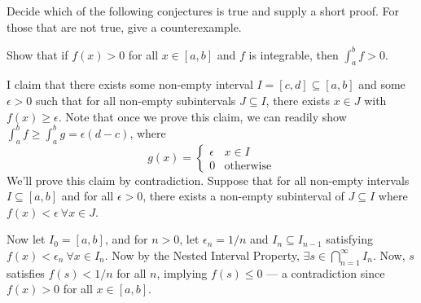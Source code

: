 \begin{exercise} Decide which of the following conjectures is true and supply a short proof. For those that are not true, give a counterexample.
\end{exercise}
\begin{solution}
\end{solution}

\begin{exercise} Show that if $f(x)>0$ for all $x \in[a, b]$ and $f$ is integrable, then $\int_{a}^{b} f>0$.
\end{exercise}
\begin{solution}
I claim that there exists some non-empty interval \(I = [c,d] \subseteq [a,b]\) and some \(\epsilon > 0\) such that for all non-empty subintervals \(J \subseteq I\), there exists \(x \in J\) with \(f(x) \geq \epsilon\). Note that once we prove this claim, we can readily show \(\int^b_a f \geq \int^b_a g = \epsilon (d-c)\), where
\[g(x) = \begin{cases}
    \epsilon & x \in I \\
    0 & \text{otherwise}
\end{cases}\]
We'll prove this claim by contradiction. Suppose that for all non-empty intervals \(I \subseteq [a,b]\) and for all \(\epsilon > 0\), there exists a non-empty subinterval of \(J \subseteq I\) where \(f(x) < \epsilon \ \forall x \in J \).

Now let \(I_0 = [a,b]\), and for \(n > 0\), let \(\epsilon_n = 1/n\) and \(I_n \subseteq I_{n-1}\) satisfying \(f(x) < \epsilon_n \ \forall x \in I_n\). Now by the Nested Interval Property, \(\exists s \in \bigcap^\infty_{n=1} I_n \). Now, \(s\) satisfies \(f(s) < 1/n\) for all \(n\), implying \(f(s) \leq 0\) --- a contradiction since \(f(x) > 0\) for all \(x \in [a,b]\).
\end{solution}

